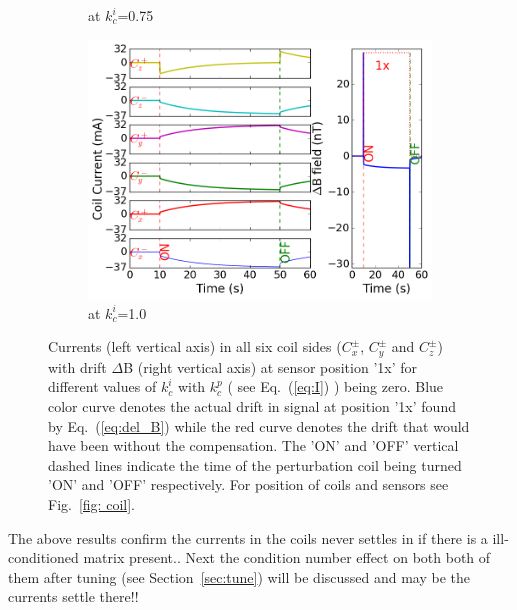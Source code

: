 \begin{figure}[!htb]
\begin{subfigure}{.5\linewidth}
        \caption{at $k_c^i$=0.75}
        \label{fig:i75m}
    \end{subfigure}%
        \begin{subfigure}{.5\linewidth}
        \centering
        \includegraphics[width=\linewidth, height= 6.5 cm]{Images/i100}
        \caption{at $k_c^i$=1.0}
        \label{fig:i100m}
    \end{subfigure}

    \caption{Currents (left vertical axis) in all six coil sides ($C_x^\pm$, $C_y^\pm$ and $C_z^\pm$) with drift $\Delta$B (right vertical axis) at sensor position '1x' for different values of $k_c^i$ with $k_c^p$ ( see Eq.~(\ref{eq:I}) ) being zero. Blue color curve denotes the actual drift in signal at position '1x' found by Eq.~(\ref{eq:del_B}) while the red curve denotes the drift that would have been without the compensation. The 'ON' and 'OFF' vertical dashed lines indicate the time of the perturbation coil being turned 'ON' and 'OFF' respectively. For position of coils and sensors see Fig.~\ref{fig: coil}.}
    \label{fig:i_pi_m}
\end{figure}





\FloatBarrier
The above results confirm the currents in the coils never settles in if there is a ill-conditioned matrix present.. Next the condition number effect on both both of them after tuning (see Section~\ref{sec:tune}) will be discussed and may be the currents settle there!!


